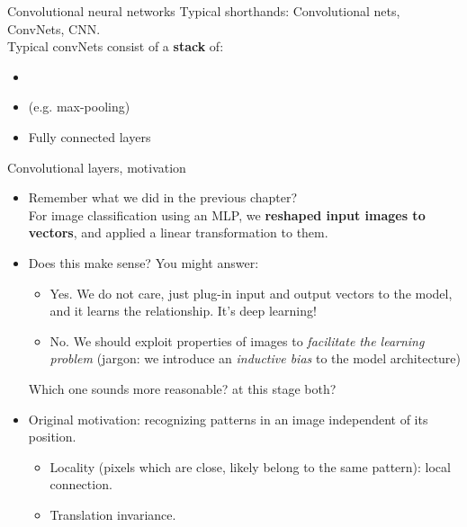 \begin{frame}{Convolutional neural networks}
Typical shorthands: Convolutional nets, ConvNets, CNN.\\
\vsp
Typical convNets consist of a \textbf{stack} of:
\begin{itemize}
\item {}
\item {} (e.g. max-pooling)
\item Fully connected layers
\end{itemize}
\end{frame}

\begin{frame}{Convolutional layers, motivation}
\begin{itemize}
\item Remember what we did in the previous chapter?\\ For image classification using an MLP, we \textbf{reshaped input images to vectors},
and applied a linear transformation to them.
\vsp
\item Does this make sense? You might answer:
\begin{itemize}
\item Yes. We do not care, just plug-in input and output vectors to the model, and it learns the relationship. It's deep learning!
\item No. We should exploit properties of images to \textit{facilitate the learning problem} (jargon: we introduce an \textit{inductive bias} to the model architecture)
\end{itemize}
Which one sounds more reasonable? at this stage both?
\vsp
\pause
\item Original motivation: recognizing patterns in an image independent of its position.
\begin{itemize}
\item Locality (pixels which are close, likely belong to the same pattern): local connection.
\item Translation invariance.
\end{itemize}
\end{itemize}
\end{frame}

